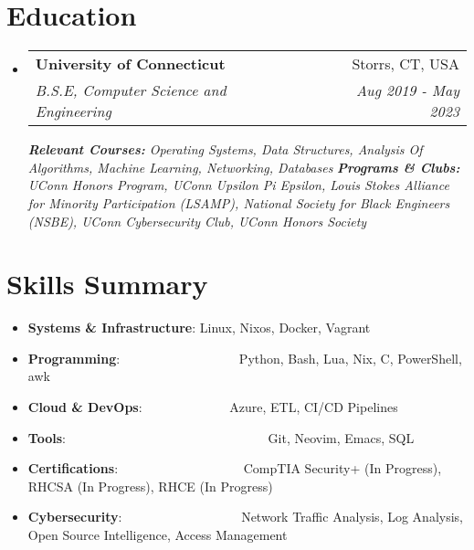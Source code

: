 \documentclass[a4paper,11pt]{article}
\makeatletter
\newcommand{\resumeItem}[2]{
  \item\small{
    \textbf{#1}{: #2 \vspace{-2pt}}
  }
}
\newcommand{\resumeSubheading}[4]{
  \vspace{-1pt}\item
    \begin{tabular*}{0.97\textwidth}{l@{\extracolsep{\fill}}r}
      \textbf{#1} & #2 \\
      \textit{#3} & \textit{#4} \\
    \end{tabular*}\vspace{-5pt}
}
\newcommand{\resumeSubItem}[2]{\resumeItem{#1}{#2}\vspace{-3pt}}
\newcommand{\resumeSubHeadingListStart}{\begin{itemize}[leftmargin=*]}
\newcommand{\resumeSubHeadingListEnd}{\end{itemize}}
\makeatother
\begin{document}
\section{Education}

\vspace{5pt}
  \begin{itemize}[leftmargin=0pt, label={}]  %
    \resumeSubheading
      {University of Connecticut}{Storrs, CT, USA}
      {B.S.E, Computer Science and Engineering}{Aug 2019 - May 2023}
      \vspace{5pt}
      {\scriptsize \textit{ \footnotesize{\newline{}\textbf{Relevant Courses:} Operating Systems, Data Structures, Analysis Of Algorithms, Machine Learning, Networking, Databases}}}
      {\scriptsize \textit{ \footnotesize{\newline{}\textbf{Programs \& Clubs:}
  UConn Honors Program, UConn Upsilon Pi Epsilon, Louis Stokes Alliance for Minority Participation (LSAMP), National Society for Black Engineers (NSBE), UConn Cybersecurity Club, UConn Honors Society}}}
  \end{itemize}
  
\section{Skills Summary}
\vspace{1pt}
	\resumeSubHeadingListStart
	\resumeSubItem{Systems \& Infrastructure}{Linux, Nixos, Docker, Vagrant}
	\resumeSubItem{Programming}{~~~~~~~~~~~~~~~~~~Python, Bash, Lua, Nix, C, PowerShell, awk}
	\resumeSubItem{Cloud \& DevOps}{~~~~~~~~~~~~~Azure, ETL, CI/CD Pipelines}
	\resumeSubItem{Tools}{~~~~~~~~~~~~~~~~~~~~~~~~~~~~~~~Git, Neovim, Emacs, SQL}
	\resumeSubItem{Certifications}{~~~~~~~~~~~~~~~~~~~CompTIA Security+ (In Progress), RHCSA (In Progress), RHCE (In Progress)}
        \resumeSubItem{Cybersecurity}{~~~~~~~~~~~~~~~~~~Network Traffic Analysis, Log Analysis, Open Source Intelligence, Access Management}
\resumeSubHeadingListEnd
\end{document}
